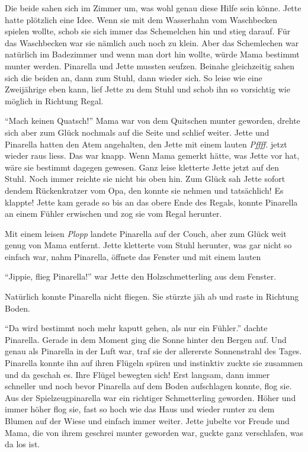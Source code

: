 Die beide sahen sich im Zimmer um, was wohl genau diese Hilfe sein könne. Jette hatte plötzlich eine Idee. Wenn sie mit dem Wasserhahn vom Waschbecken spielen wollte, schob sie sich immer das Schemelchen hin und stieg darauf. Für das Waschbecken war sie nämlich auch noch zu klein.  Aber das Schemlechen war natürlich im Badezimmer und wenn man dort hin wollte, würde Mama bestimmt munter werden. Pinarella und Jette mussten seufzen. Beinahe gleichzeitig sahen sich die beiden an, dann zum Stuhl, dann wieder sich. So leise wie eine Zweijährige eben kann, lief Jette zu dem Stuhl und schob ihn so vorsichtig wie möglich in Richtung Regal.

\enquote{Mach keinen Quatsch!} Mama war von dem Quitschen munter geworden, drehte sich aber zum Glück nochmals auf die Seite und schlief weiter. Jette und Pinarella hatten den Atem angehalten, den Jette mit einem lauten {\it Pffff.} jetzt wieder raus liess. Das war knapp. Wenn Mama gemerkt hätte, was Jette vor hat, wäre sie bestimmt dagegen gewesen. Ganz leise kletterte Jette jetzt auf den Stuhl. Noch immer reichte sie nicht bis oben hin. Zum Glück sah Jette sofort dendem Rückenkratzer vom Opa, den konnte sie nehmen und tatsächlich! Es klappte! Jette kam gerade so bis an das obere Ende des Regals, konnte Pinarella an einem Fühler erwischen und zog sie vom Regal herunter.

Mit einem leisen {\it Plopp} landete Pinarella auf der Couch, aber zum Glück weit genug von Mama entfernt. Jette kletterte vom Stuhl herunter, was gar nicht so einfach war, nahm Pinarella, öffnete das Fenster und mit einem lauten 

\enquote{Jippie, flieg Pinarella!} war Jette den Holzschmetterling aus dem Fenster.

Natürlich konnte Pinarella nicht fliegen. Sie stürzte jäh ab und raste in Richtung Boden. 

\enquote{Da wird bestimmt noch mehr kaputt gehen, als nur ein Fühler.} dachte Pinarella. Gerade in dem Moment ging die Sonne hinter den Bergen auf. Und genau als Pinarella in der Luft war, traf sie der allererste Sonnenstrahl des Tages. Pinarella konnte ihn auf ihren Flügeln spüren und instinktiv zuckte sie zusammen und da geschah es. Ihre Flügel bewegten sich! Erst langsam, dann immer schneller und noch bevor Pinarella auf dem Boden aufschlagen konnte, flog sie. Aus der Spielzeugpinarella war ein richtiger Schmetterling geworden. Höher und immer höher flog sie, fast so hoch wie das Haus und wieder runter zu dem Blumen auf der Wiese und einfach immer weiter. Jette jubelte vor Freude und Mama, die von ihrem geschrei munter geworden war, guckte ganz verschlafen, was da los ist.

